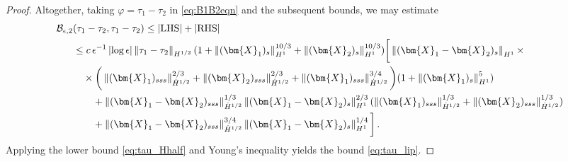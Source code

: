 \documentclass[11pt,reqno]{amsart}
\newcommand{\X}{\bm{X}}
\newcommand{\abs}[1]{\left\lvert #1 \right\rvert}
\newcommand{\norm}[1]{\left\lVert #1 \right\rVert}
\newcommand{\mc}[1]{\mathcal{#1}}
\numberwithin{equation}{section}
\theoremstyle{definition}
\begin{document}
\begin{proof}
Altogether, taking $\varphi=\tau_1-\tau_2$ in \eqref{eq:B1B2eqn} and the subsequent bounds, we may estimate 
\begin{equation}
\begin{aligned}
  \mc{B}_{\epsilon,2}&(\tau_1-\tau_2,\tau_1-\tau_2) \le \abs{{\rm LHS}}+\abs{{\rm RHS}}\\
  &\le 
  c\,\epsilon^{-1}\abs{\log\epsilon}\norm{\tau_1-\tau_2}_{H^{1/2}}(1+\norm{(\X_1)_s}_{H^1}^{10/3}+\norm{(\X_2)_s}_{H^1}^{10/3})\bigg[\norm{(\X_1-\X_2)_s}_{H^1}\times\\
  &\quad\times\bigg(\norm{(\X_1)_{sss}}_{\dot H^{1/2}}^{2/3} + \norm{(\X_2)_{sss}}_{\dot H^{1/2}}^{2/3} + \norm{(\X_1)_{sss}}_{\dot H^{1/2}}^{3/4}\bigg)(1+\norm{(\X_1)_s}_{H^1}^5) \\
  &\qquad + \norm{(\X_1-\X_2)_{sss}}_{\dot H^{1/2}}^{1/3}\norm{(\X_1-\X_2)_s}_{H^1}^{2/3}(\norm{(\X_1)_{sss}}_{\dot H^{1/2}}^{1/3}+\norm{(\X_2)_{sss}}_{\dot H^{1/2}}^{1/3}) \\
  &\qquad  + \norm{(\X_1-\X_2)_{sss}}_{\dot H^{1/2}}^{3/4}\norm{(\X_1-\X_2)_s}_{H^1}^{1/4} \bigg] \,.
\end{aligned}
\end{equation}
%
%
Applying the lower bound \eqref{eq:tau_Hhalf} and Young's inequality yields the bound \eqref{eq:tau_lip}. 
%
%
%
\end{proof}











\end{document}
